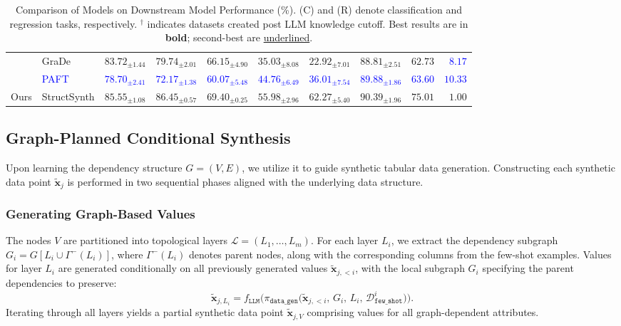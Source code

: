 \begin{table}[ht]
{\begin{tabular}{ll llllll cr}
    & GraDe & $83.72_{\pm 1.44}$ & $79.74_{\pm 2.01}$ & $66.15_{\pm 4.90}$ & $35.03_{\pm 8.08}$ & $22.92_{\pm 7.01}$ & $88.81_{\pm 2.51}$ & $62.73$ & \textcolor{blue}{$8.17$} \\
    & \textcolor{blue}{PAFT} & \textcolor{blue}{$78.70_{\pm 2.41}$} & \textcolor{blue}{$72.17_{\pm 1.38}$} & \textcolor{blue}{$60.07_{\pm 5.48}$} & \textcolor{blue}{$44.76_{\pm 6.49}$} & \textcolor{blue}{$36.01_{\pm 7.54}$} & \textcolor{blue}{\underline{$89.88_{\pm 1.86}$}} & \textcolor{blue}{$63.60$} & \textcolor{blue}{$10.33$} \\
    \midrule
    \multirow{1}{*}{Ours} & StructSynth & $\boldsymbol{85.55_{\pm 1.08}}$ & $\boldsymbol{86.45_{\pm 0.57}}$ & $\boldsymbol{69.40_{\pm 0.25}}$ & $\boldsymbol{55.98_{\pm 2.96}}$ & $\boldsymbol{62.27_{\pm 5.40}}$ & $\boldsymbol{90.39_{\pm 1.96}}$ & $\boldsymbol{75.01}$ & $\boldsymbol{1.00}$ \\
    
    \bottomrule
    \end{tabular}}%
    \caption{Comparison of Models on Downstream Model Performance (\%). (C) and (R) denote classification and regression tasks, respectively. $^\dag$ indicates datasets created post LLM knowledge cutoff. Best results are in \textbf{bold}; second-best are \underline{underlined}.}
    \label{tab:results_comparison_performance}
\end{table}

\subsection{Graph-Planned Conditional Synthesis}
\label{sec:synth}

Upon learning the dependency structure $G=(V, E)$, we utilize it to guide synthetic tabular data generation. Constructing each synthetic data point $\tilde{\mathbf{x}}_j$ is performed in two sequential phases aligned with the underlying data structure.

\subsubsection{Generating Graph-Based Values}

The nodes $V$ are partitioned into topological layers $\mathcal{L} = (L_1, \dots, L_m)$. For each layer $L_i$, we extract the dependency subgraph $G_i = G[L_i \cup \Gamma^{-}(L_i)]$, where $\Gamma^{-}(L_i)$ denotes parent nodes, along with the corresponding columns from the few-shot examples.
Values for layer $L_i$ are generated conditionally on all previously generated values $\tilde{\mathbf{x}}_{j, <i}$, with the local subgraph $G_i$ specifying the parent dependencies to preserve:
\begin{equation}
\tilde{\mathbf{x}}_{j,L_i} = f_{\mathtt{LLM}}\!\Big(\pi_{\mathtt{data\_gen}}\!\big(\tilde{\mathbf{x}}_{j,<i},\, G_i,\, L_i,\, \mathcal{D}_{\mathtt{few\_shot}}^i\big)\!\Big).
\end{equation}
Iterating through all layers yields a partial synthetic data point $\tilde{\mathbf{x}}_{j, V}$ comprising values for all graph-dependent attributes.

